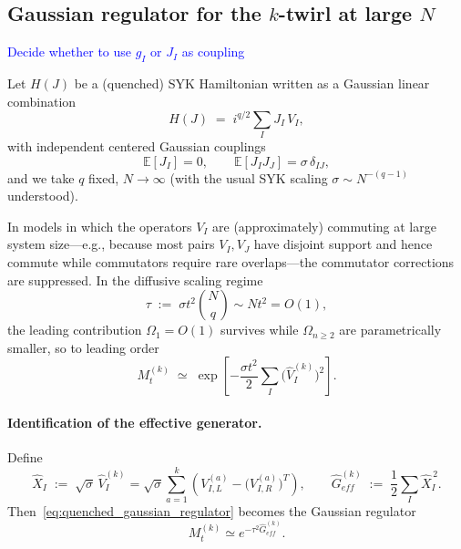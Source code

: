 \documentclass{article}
\theoremstyle{definition}
\newcommand{\NL}[1]{\textcolor{blue}{#1}}
\begin{document}
    \subsection{Gaussian regulator for the $k$-twirl at large $N$}
    \label{subsec:quenched_syk_gaussian_regulator}
    \NL{Decide whether to use $g_{I}$ or $J_{I}$ as coupling}

    Let $H(J)$ be a (quenched) SYK Hamiltonian written as a Gaussian linear combination
    \begin{equation}
        H(J)\;=\; i^{q/2}\sum_{I}J_{I}\,V_{I},
    \end{equation}
    with independent centered Gaussian couplings
    \begin{equation}
        \mathbb{E}[J_{I}]=0, \qquad \mathbb{E}[J_{I}J_{J}]=\sigma\,\delta_{IJ},
    \end{equation}
    and we take $q$ fixed, $N\to\infty$ (with the usual SYK scaling $\sigma\sim N
    ^{-(q-1)}$ understood).


    In models in which the operators $V_{I}$ are (approximately) commuting at large
    system size---e.g., because most pairs $V_{I},V_{J}$ have disjoint support and
    hence commute while commutators require rare overlaps---the commutator corrections
    are suppressed. In the diffusive scaling regime
    \begin{equation}
        \tau \;:=\;\sigma t^{2}\binom{N}{q}\sim N t^{2}= O(1),
    \end{equation}
    the leading contribution $\Omega_{1}=O(1)$ survives while $\Omega_{n\ge2}$
    are parametrically smaller, so to leading order
    \begin{equation}
        M_{t}^{(k)}\;\simeq\; \exp\!\left[-\frac{\sigma t^{2}}{2}\sum_{I}\big(\widehat
        V_{I}^{(k)}\big)^{2}\right]. \label{eq:quenched_gaussian_regulator}
    \end{equation}

    \paragraph{Identification of the effective generator.}
    Define
    \begin{equation}
        \widehat X_{I}\;:=\;\sqrt{\sigma}\,\widehat V_{I}^{(k)}=\sqrt{\sigma}\sum
        _{a=1}^{k}\!\left(V_{I,L}^{(a)}-\big(V_{I,R}^{(a)}\big)^{T}\right), \qquad
        \widehat G_{eff}^{(k)}\;:=\;\frac{1}{2}\sum_{I}\widehat X_{I}^{\,2}. \label{eq:hatGeff_quenched}
    \end{equation}
    Then~\eqref{eq:quenched_gaussian_regulator} becomes the Gaussian regulator
    \begin{equation}
        M_{t}^{(k)}\simeq e^{-\tau^2\hat{G}_{eff}^{(k)}}. \label{eq:Mt_exp_hatGeff}
    \end{equation}
\end{document}
